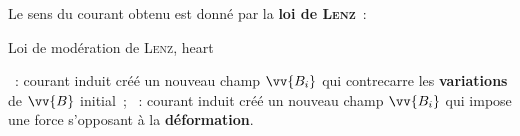 \documentclass[../main/main.tex]{subfiles}
\begin{document}
Le sens du courant obtenu est donné par la \textbf{loi de \textsc{Lenz}}~:
\begin{tprop}{Loi de modération de \textsc{Lenz}, heart}
	\begin{center}
	\end{center}
\end{tprop}

\begin{itemize}[label=$\diamond$, leftmargin=10pt]
	~: courant induit créé un nouveau champ $\vv{B_i}$ qui
	contrecarre les \textbf{variations} de $\vv{B}$ initial~;
	~: courant induit créé un nouveau champ $\vv{B_i}$ qui
	impose une force s'opposant à la \textbf{déformation}.
\end{itemize}
\end{document}
